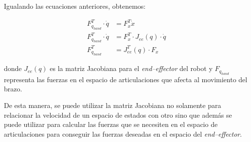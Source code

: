 Igualando las ecuaciones anteriores, obtenemos:

\begin{align*}
    F^T_{q_{hand}} \cdot{} \dot{q} &= F^T_x \dot{x} \\
    F^T_{q_{hand}} \cdot{} \dot{q} &= F^T_x \cdot{} J_{ee}\left(q\right) \cdot \dot{q} \\
    F^T_{q_{hand}} &= J^T_{ee}\left(q\right) \cdot F_x
\end{align*}

donde $J_{ee}\left(q\right)$ es la matriz Jacobiana para el \textit{end--effector}
del robot y $F_{q_{hand}}$ representa las fuerzas en el espacio de articulaciones
que afecta al movimiento del brazo.

De esta manera, se puede utilizar la matriz Jacobiana no solamente para relacionar
la velocidad de un espacio de estados con otro sino que además se puede utilizar
para calcular las fuerzas que se necesiten en el espacio de articulaciones para conseguir
las fuerzas deseadas en el espacio del \textit{end--effector}.